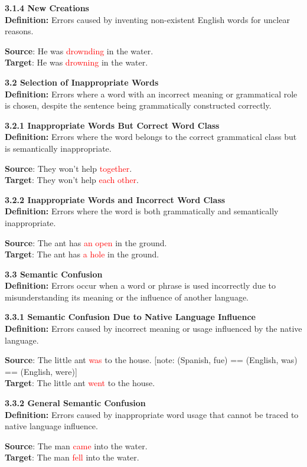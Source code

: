 \begin{tcolorbox}[breakable]
\noindent \textbf{3.1.4 New Creations}\\
\textbf{Definition:} Errors caused by inventing non-existent English words for unclear reasons.


\textbf{Source}: He was \textcolor{red}{drownding} in the water. \\
\textbf{Target}: He was \textcolor{red}{drowning} in the water.


\noindent \textbf{3.2 Selection of Inappropriate Words}\\
\textbf{Definition:} Errors where a word with an incorrect meaning or grammatical role is chosen, despite the sentence being grammatically constructed correctly.

\noindent  \textbf{3.2.1 Inappropriate Words But Correct Word Class}\\
\textbf{Definition:} Errors where the word belongs to the correct grammatical class but is semantically inappropriate.


\textbf{Source}: They won't help \textcolor{red}{together}. \\
\textbf{Target}: They won't help \textcolor{red}{each other}.


\noindent  \textbf{3.2.2 Inappropriate Words and Incorrect Word Class}\\
\textbf{Definition:} Errors where the word is both grammatically and semantically inappropriate.


\textbf{Source}: The ant has \textcolor{red}{an open} in the ground. \\
\textbf{Target}: The ant has \textcolor{red}{a hole} in the ground.


\noindent \textbf{3.3 Semantic Confusion}\\
\textbf{Definition:} Errors occur when a word or phrase is used incorrectly due to misunderstanding its meaning or the influence of another language.

\noindent \textbf{3.3.1 Semantic Confusion Due to Native Language Influence}\\
\textbf{Definition:} Errors caused by incorrect meaning or usage influenced by the native language.


\textbf{Source}: The little ant \textcolor{red}{was} to the house. [note: (Spanish, fue) == (English, was) == (English, were)] \\
\textbf{Target}: The little ant \textcolor{red}{went} to the house.


\noindent \textbf{3.3.2 General Semantic Confusion}\\
\textbf{Definition:} Errors caused by inappropriate word usage that cannot be traced to native language influence.


\textbf{Source}: The man \textcolor{red}{came} into the water. \\
\textbf{Target}: The man \textcolor{red}{fell} into the water.

\end{tcolorbox}

